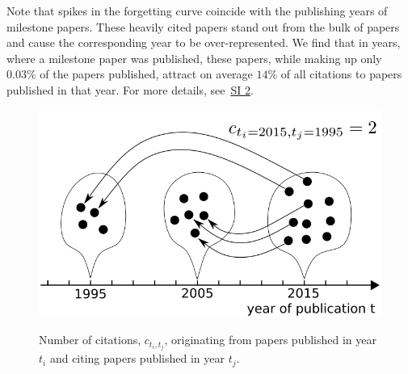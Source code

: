 \documentclass[fleqn,10pt]{wlscirep}
\begin{document}
Note that spikes in the forgetting curve coincide with the publishing years of milestone papers. These heavily cited papers stand out from the bulk of papers and cause the corresponding year to be over-represented. We find that in years, where a milestone paper was published, these papers, while making up only $0.03\%$ of the papers published, attract on average $14\%$ of all citations to papers published in that year. For more details, see~\hyperref[SI2]{SI 2}.

\begin{figure}[h!]
	\centering
	  \includegraphics[width=0.7\columnwidth]{1a.png}\\
		\caption{ 
		Number of citations, $c_{t_i,t_j}$, originating from papers published in year $t_i$ and citing papers published in year $t_j$.}
	\label{fig:aor}
\end{figure}
\end{document}
